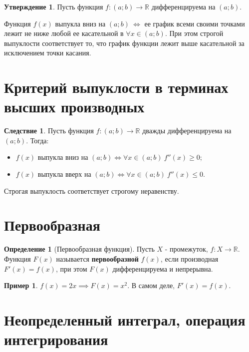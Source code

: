 \documentclass{report}
\theoremstyle{definition}
\newtheorem*{definition}{Определение}
\newtheorem*{example}{Пример}
\newtheorem*{effect}{Следствие}
\newtheorem*{statement}{Утверждение}
\begin{document}
\begin{statement}
    Пусть функция $f:(a;b)\rightarrow\mathbb{R}$ дифференцируема на $(a;b)$.

    Функция $f(x)$ выпукла вниз на $(a;b) \ \iff$ ее график всеми своими точками лежит не ниже любой ее касательной в $\forall x \in (a;b)$. При этом строгой выпуклости соответствует то, что график функции лежит выше касательной за исключением точки касания. 
\end{statement}

\section{Критерий выпуклости в терминах высших производных}

\begin{effect}
    Пусть функция $f:(a;b)\rightarrow \mathbb{R}$ дважды дифференцируема на $(a;b)$. Тогда:
    \begin{itemize}
        \item $f(x)$ выпукла вниз на $(a;b) \iff \forall x \in (a;b) \ f''(x) \geqslant 0$;
        \item $f(x)$ выпукла вверх на $(a;b) \iff \forall x \in (a;b) \ f''(x) \leqslant 0$.
    \end{itemize}

    Строгая выпуклость соответствует строгому неравенству.
\end{effect}

\section{Первообразная}

\begin{definition}[Первообразная функция]
    Пусть \(X\) - промежуток, \(f:X\rightarrow \mathbb{R}\). Функция \(F(x)\) называется
    \textbf{первообразной} \(f(x)\), если производная \(F'(x) = f(x)\), при этом \(F(x)\)
    дифференцируема и непрерывна.
\end{definition}

\begin{example}
    \(f(x) = 2x \implies F(x) = x^{2}\). В самом деле, \(F'(x) = f(x)\).
\end{example}

\section{Неопределенный интеграл, операция интегрирования}
\end{document}
